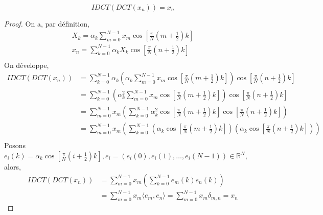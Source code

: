 $$IDCT(DCT(x_n)) = x_n$$
\begin{proof}
    On a, par définition,
    \begin{align*}
        X_k = \alpha_k\sum_{m=0}^{N-1}x_m\cos \left[\frac{\pi}{N}\left(m+\frac{1}{2}\right)k\right] \\
        x_n = \sum_{k=0}^{N-1}\alpha_k X_k\cos \left[\frac{\pi}{N}\left(n+\frac{1}{2}\right)k\right]\\
    \end{align*}
    On développe, 
    \begin{align*}
        IDCT(DCT(x_n))&=\sum_{k=0}^{N-1}\alpha_k \left(\alpha_k\sum_{m=0}^{N-1}x_m\cos \left[\frac{\pi}{N}\left(m+\frac{1}{2}\right)k\right]\right)\cos \left[\frac{\pi}{N}\left(n+\frac{1}{2}\right)k\right]\\
        &=\sum_{k=0}^{N-1}\left(\alpha_k^2\sum_{m=0}^{N-1}x_m\cos \left[\frac{\pi}{N}\left(m+\frac{1}{2}\right)k\right]\right)\cos \left[\frac{\pi}{N}\left(n+\frac{1}{2}\right)k\right]\\
        &=\sum_{m=0}^{N-1}x_m\left(\sum_{k=0}^{N-1}\alpha_k^2\cos \left[\frac{\pi}{N}\left(m+\frac{1}{2}\right)k\right]\cos \left[\frac{\pi}{N}\left(n+\frac{1}{2}\right)k\right]\right)\\
        &=\sum_{m=0}^{N-1}x_m\left(\sum_{k=0}^{N-1}\left(\alpha_k\cos \left[\frac{\pi}{N}\left(m+\frac{1}{2}\right)k\right]\right)\left(\alpha_k\cos \left[\frac{\pi}{N}\left(n+\frac{1}{2}\right)k\right]\right)\right) \\
    \end{align*}
    Posons $e_i(k) =\alpha_k\cos\left[\frac{\pi}{N}\left(i+\frac{1}{2}\right)k\right], e_i=(e_i(0),e_i(1), \dots ,e_i(N-1)) \in \mathbb{R}^N$, alors,
    \begin{align*}    
        IDCT(DCT(x_n)) &=\sum_{m=0}^{N-1}x_m\left(\sum_{k=0}^{N-1}e_m(k)e_n(k)\right) \\
        &=\sum_{m=0}^{N-1}x_m\langle e_m,e_n\rangle =\sum_{m=0}^{N-1}x_m\delta_{m,n} = x_n
    \end{align*}
\end{proof}